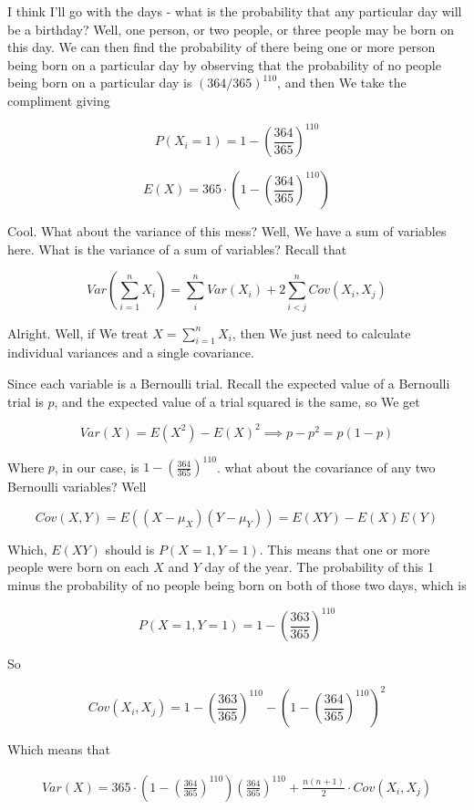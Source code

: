 \documentclass{article}
\begin{document}
			I think I'll go with the days - what is the probability that any particular day will be a birthday? Well, one person, or two people, or three people may be born on this day. We can then find the probability of there being one or more person being born on a particular day by observing that the probability of no people being born on a particular day is $(364/365)^110$, and then We take the compliment giving
			
			\[ P(X_i = 1) = 1-\left(\frac{364}{365}\right)^{110} \]
			
			\[ E(X) = 365\cdot \left(1-\left(\frac{364}{365}\right)^{110} \right) \]
			
			Cool. What about the variance of this mess? Well, We have a sum of variables here. What is the variance of a sum of variables? Recall that
			
			\[ Var\left( \sum^n_{i=1} X_i\right) = \sum^n_i Var(X_i) + 2\sum^n_{i<j} Cov(X_i, X_j) \]
			
			Alright. Well, if We treat $X = \sum^n_{i=1} X_i$, then We just need to calculate individual variances and a single covariance.
			
			Since each variable is a Bernoulli trial. Recall the expected value of a Bernoulli trial is $p$, and the expected value of a trial squared is the same, so We get
			
			\[ Var(X) = E(X^2) - E(X)^2 \implies p - p^2 = p(1-p) \]
			
			Where $p$, in our case, is $1-\left(\frac{364}{365}\right)^{110}$. what about the covariance of any two Bernoulli variables? Well
			
			\[ Cov(X, Y) = E((X-\mu_X)(Y-\mu_Y)) = E(XY) - E(X)E(Y) \]
			
			Which, $E(XY)$ should is $P(X=1, Y=1)$. This means that one or more people were born on each $X$ and $Y$ day of the year. The probability of this 1 minus the probability of no people being born on both of those two days, which is 
			
			\[ P(X=1, Y=1) = 1- \left(\frac{363}{365} \right)^{110} \] 
			
			So
			
			\[ Cov(X_i, X_j) = 1- \left(\frac{363}{365} \right)^{110} - \left(1-\left(\frac{364}{365}\right)^{110}\right)^2 \]
			
			Which means that 
			
			\begin{align*}
			Var(X) = 365\cdot\left(1-\left(\frac{364}{365}\right)^{110} \right)  \left(\frac{364}{365}\right)^{110} + \frac{n(n+1)}{2}\cdot Cov(X_i, X_j)
			\end{align*}
			
\end{document}
